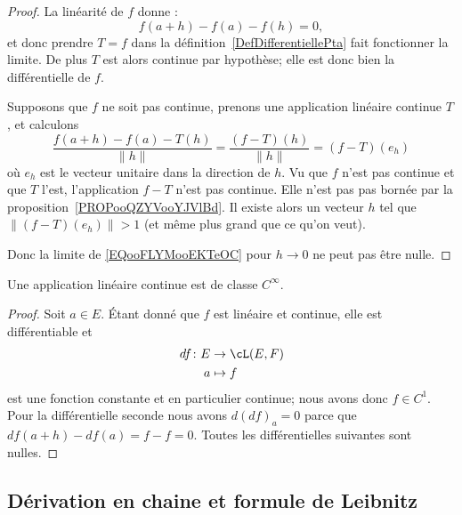 \begin{proof}
	La linéarité de \( f\) donne :
	\begin{equation}
		f(a+h)-f(a)-f(h)=0,
	\end{equation}
	et donc prendre \( T=f\) dans la définition~\ref{DefDifferentiellePta} fait fonctionner la limite. De plus \( T\) est alors continue par hypothèse; elle est donc bien la différentielle de \( f\).

	Supposons que \( f\) ne soit pas continue, prenons une application linéaire continue \( T\), et calculons
	\begin{equation}        \label{EQooFLYMooEKTeOC}
		\frac{ f(a+h)-f(a)-T(h) }{ \| h \| }=\frac{ (f-T)(h) }{ \| h \| }=(f-T)(e_h)
	\end{equation}
	où \( e_h\) est le vecteur unitaire dans la direction de \( h\). Vu que \( f\) n'est pas continue et que \( T\) l'est, l'application \( f-T\) n'est pas continue. Elle n'est pas pas bornée par la proposition~\ref{PROPooQZYVooYJVlBd}. Il existe alors un vecteur \( h\) tel que \( \| (f-T)(e_h) \|>1\) (et même plus grand que ce qu'on veut).

	Donc la limite de \eqref{EQooFLYMooEKTeOC} pour \( h\to 0\) ne peut pas être nulle.
\end{proof}

\begin{lemma}   \label{LemLLvgPQW}
	Une application linéaire continue est de classe \(  C^{\infty}\).
\end{lemma}

\begin{proof}
	Soit \( a\in E\). Étant donné que \( f\) est linéaire et continue, elle est différentiable et
	\begin{equation}
		\begin{aligned}
			df\colon E & \to \cL(E,F) \\
			a          & \mapsto f
		\end{aligned}
	\end{equation}
	est une fonction constante et en particulier continue; nous avons donc \( f\in C^1\). Pour la différentielle seconde nous avons \( d(df)_a=0\) parce que \( df(a+h)-df(a)=f-f=0\). Toutes les différentielles suivantes sont nulles.
\end{proof}

\subsection{Dérivation en chaine et formule de Leibnitz}

